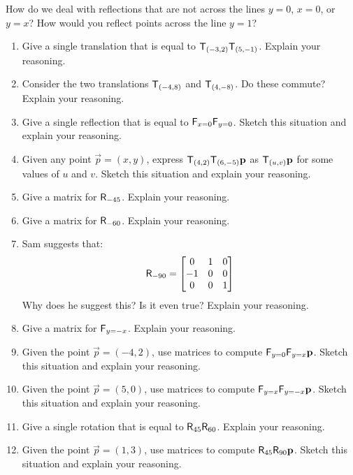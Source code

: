 \begin{question} 
How do we deal with reflections that are not across the lines $y=0$,
$x=0$, or $y=x$? How would you reflect points across the line $y = 1$?
\end{question}
\QM


\begin{problems}

\begin{enumerate}
\item Give a single translation that is equal to
  $\mathsf{T}_{(-3,2)}\mathsf{T}_{(5,-1)}$. Explain your reasoning.
\item Consider the two translations $\mathsf{T}_{(-4,8)}$ and
  $\mathsf{T}_{(4,-8)}$.  Do these commute?  Explain your reasoning.
\item Give a single reflection that is equal to
  $\mathsf{F}_{x=0}\mathsf{F}_{y=0}$. Sketch this situation and
  explain your reasoning.
\item Given any point $\vec{p} = (x,y)$, express
  $\mathsf{T}_{(4,2)}\mathsf{T}_{(6,-5)}\mathbf{p}$ as $\mathsf{T}_{(u,v)}\mathbf{p}$
  for some values of $u$ and $v$. Sketch this situation and explain
  your reasoning.
\item Give a matrix for $\mathsf{R}_{-45}$. Explain your reasoning.
\item Give a matrix for $\mathsf{R}_{-60}$. Explain your reasoning.
\item Sam suggests that:
\[
\mathsf{R}_{-90} = 
\begin{bmatrix}
0 & 1 & 0 \\
-1 & 0 & 0 \\ 
0 & 0 & 1
\end{bmatrix}
\]
Why does he suggest this? Is it even true? Explain your reasoning.
\item Give a matrix for $\mathsf{F}_{y=-x}$. Explain your reasoning.
\item Given the point $\vec{p}=(-4,2)$, use matrices to compute
  $\mathsf{F}_{y=0}\mathsf{F}_{y=x}\mathbf{p}$. Sketch this situation and
  explain your reasoning.
\item Given the point $\vec{p}=(5,0)$, use matrices to compute
  $\mathsf{F}_{y=x}\mathsf{F}_{y=-x}\mathbf{p}$. Sketch this situation and
  explain your reasoning.
\item Give a single rotation that is equal to
  $\mathsf{R}_{45}\mathsf{R}_{60}$. Explain your reasoning.
\item Given the point $\vec{p}=(1,3)$, use matrices to compute
  $\mathsf{R}_{45}\mathsf{R}_{90}\mathbf{p}$.  Sketch this situation and
  explain your reasoning.

\end{enumerate}
\end{problems}
